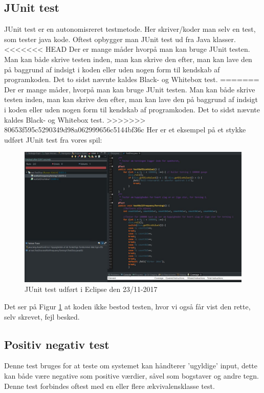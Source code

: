     \subsection{JUnit test}
        JUnit test er en autonomisreret testmetode. Her skriver/koder man selv en test, som tester java kode. Oftest opbygger man JUnit test ud fra Java klasser.
<<<<<<< HEAD
        Der er mange måder hvorpå man kan bruge JUnit testen. Man kan både skrive testen inden, man kan skrive den efter, man kan lave den på baggrund af indsigt i koden eller uden nogen form til kendskab af programkoden. Det to sidst nævnte kaldes Black- og Whitebox test.
=======
        Der er mange måder, hvorpå man kan bruge JUnit testen. Man kan både skrive testen inden, man kan skrive den efter, man kan lave den på baggrund af indsigt i koden eller uden nogen form til kendskab af programkoden. Det to sidst nævnte kaldes Black- og Whitebox test.
>>>>>>> 80653f595c5290349d98a062999656c5144bf36c
        Her er et eksempel på et stykke udført JUnit test fra vores spil:
            \begin{figure}[h]\label{fig:JUnitTest} %
                \advance\leftskip-3cm
                \includegraphics[width=20cm]{fig/JUnitTestDice.jpg}
                \caption{JUnit test udført i Eclipse den 23/11-2017}
            \end{figure}
        Det ser på Figur \ref{fig:JUnitTest} at koden ikke bestod testen, hvor vi også får vist den rette, selv skrevet, fejl besked.

    \subsection{Positiv negativ test}
        Denne test bruges for at teste om systemet kan håndterer 'ugyldige' input, dette kan både være negative som positive værdier, såvel som bogstaver og andre tegn. Denne test forbindes oftest med en eller flere ækvivalensklasse test.
